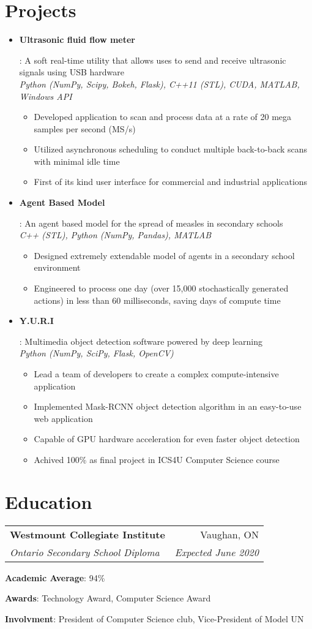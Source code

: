 \documentclass[letterpaper,10pt]{article}
\makeatletter
\newcommand{\resumeItem}[2]{
  \item\small{
    \textbf{#1}{: #2 \vspace{-2pt}}
  }
}
\newcommand{\resumeItemNoBullet}[2]{
  \item[]\small{
    \hspace{-9pt}\textbf{#1}{: #2 \vspace{-6pt}}
  }
}
\newcommand{\resumeSubheading}[4]{
  \vspace{-1pt}\item[]
  \begin{tabular*}{0.98\textwidth}{l@{\extracolsep{\fill}}r}
      \hspace{-10pt}\textbf{#1} & #2 \\
      \hspace{-10pt}\textit{\small#3} & \textit{\small #4} \\
    \end{tabular*}\vspace{-5pt}
}
\newcommand{\resumeSubItem}[2]{\resumeItem{#1}{#2}\vspace{-4pt}}
\newcommand{\resumeSubHeadingListStart}{\begin{itemize}[leftmargin=*]}
\newcommand{\resumeSubHeadingListEnd}{\end{itemize}}
\newcommand{\shorterSection}[1]{\vspace{-10pt}\section{#1}}
\makeatother
\begin{document}
\shorterSection{Projects}
  \resumeSubHeadingListStart
    \resumeSubItem{Ultrasonic fluid flow meter}
     {A soft real-time utility that allows uses to send and receive ultrasonic signals using USB hardware \\
     \emph{Python (NumPy, Scipy, Bokeh, Flask), C++11 (STL), CUDA, MATLAB, Windows API}
        \vspace{-5pt}
        \begin{itemize}
            \item Developed application to scan and process data at a rate of 20 mega samples per second (MS/s)
            \item Utilized asynchronous scheduling to conduct multiple back-to-back scans with minimal idle time
            \item First of its kind user interface for commercial and industrial applications
        \end{itemize}
     }
     \resumeSubItem{Agent Based Model}
     {An agent based model for the spread of measles in secondary schools \\
     \emph{C++ (STL), Python (NumPy, Pandas), MATLAB}
        \vspace{-5pt}
        \begin{itemize}
            \item Designed extremely extendable model of agents in a secondary school environment
            \item Engineered to process one day (over 15,000 stochastically generated actions) in less than 60 milliseconds, saving days of compute time
        \end{itemize}
     }
     \resumeSubItem{Y.U.R.I}
     {Multimedia object detection software powered by deep learning \\
     \emph{Python (NumPy, SciPy, Flask, OpenCV)}
        \vspace{-5pt}
        \begin{itemize}
            \item Lead a team of developers to create a complex compute-intensive application
            \item Implemented Mask-RCNN object detection algorithm in an easy-to-use web application
            \item Capable of GPU hardware acceleration for even faster object detection
            \item Achived 100\% as final project in ICS4U Computer Science course 
        \end{itemize}
     }
  \resumeSubHeadingListEnd

\shorterSection{Education}
  \resumeSubHeadingListStart
    \resumeSubheading
      {Westmount Collegiate Institute}{Vaughan, ON}
      {Ontario Secondary School Diploma}{Expected June 2020}{
      \resumeItemNoBullet{Academic Average}{94\%}
      \resumeItemNoBullet{Awards}{Technology Award, Computer Science Award}
      \resumeItemNoBullet{Involvment}{President of Computer Science club, Vice-President of Model UN}
    }
  \resumeSubHeadingListEnd
\end{document}
